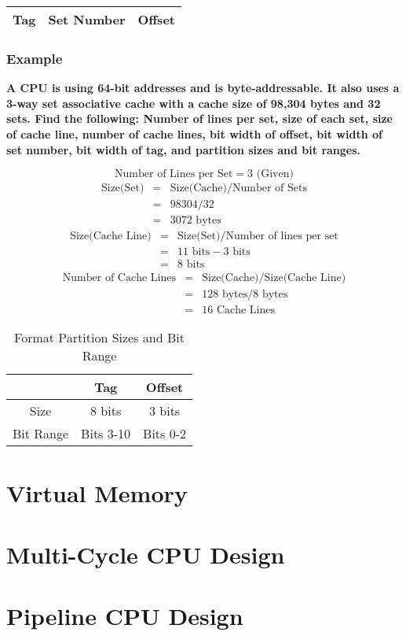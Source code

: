 \documentclass[11pt]{article}
\begin{document}
\begin{table}[H]
	\centering
	\begin{tabular}{| c | c | c|}
		\hline
		Tag			&		Set Number	&	 Offset\\
		\hline
	\end{tabular}
\end{table}

\subsubsection{Example}

\textbf{A CPU is using 64-bit addresses and is byte-addressable. It also uses a 3-way set associative cache with a cache size of 98,304 bytes and 32 sets. Find the following: Number of lines per set, size of each set, size of cache line, number of cache lines, bit width of offset, bit width of set number, bit width of tag, and partition sizes and bit ranges.}

\[
	\text{Number of Lines per Set} = 3 \text{ (Given)}
\]
\begin{eqnarray*}
	\text{Size(Set)} &=& \text{Size(Cache)} / \text{Number of Sets}\\
		&=& 98304 / 32\\
		&=& 3072 \text{ bytes}
\end{eqnarray*}
\begin{eqnarray*}
	\text{Size(Cache Line)} &=& \text{Size(Set)} / \text{Number of lines per set}\\
	&=& 11 \text{ bits} - 3 \text{ bits}\\
	&=& 8 \text{ bits}
\end{eqnarray*}
\begin{eqnarray*}
	\text{Number of Cache Lines} &=& \text{Size(Cache)} / \text{Size(Cache Line)}\\
	&=& 128 \text{ bytes} / 8 \text{ bytes}\\
	&=& 16 \text{ Cache Lines}
\end{eqnarray*}

\begin{table}[H]
	\centering
	\caption*{Format Partition Sizes and Bit Range}
	\begin{tabular}{| c | c | c |}
		\hline
		&	Tag		&	Offset\\
		\hline
		Size		&	8 bits		&	3 bits\\
		\hline
		Bit Range	&	Bits 3-10	&	Bits 0-2\\
		\hline
	\end{tabular}
\end{table}

\section{Virtual Memory}

\section{Multi-Cycle CPU Design}

\section{Pipeline CPU Design}
\end{document}
